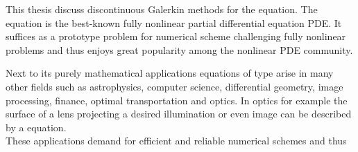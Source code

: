 This thesis discuss discontinuous Galerkin methods for the \MA equation. 
The \MA equation is the best-known fully nonlinear partial differential equation PDE. It suffices as a prototype problem for numerical scheme challenging fully nonlinear problems and thus enjoys great popularity among the nonlinear PDE community.

Next to its purely mathematical applications equations of \MA type arise in many other fields such as astrophysics, computer science, differential geometry, image processing, finance, optimal transportation and optics\cite{FGN2013}. 
In optics for example the surface of a lens projecting a desired illumination or even image can be described by a \MA equation\cite{KW2010, BHP2014}. \\
These applications demand for efficient and reliable numerical schemes and thus 